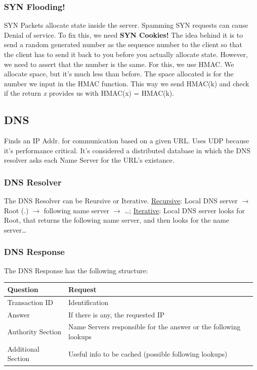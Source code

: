 \documentclass[11pt]{article}
\begin{document}
{\subsubsection{SYN Flooding!}
\label{sec:orgac9980e}
SYN Packets allocate state inside the server. Spamming SYN requests can cause Denial of service. To fix this, we need \textbf{SYN Cookies!} The idea behind it is to send a random generated number as the sequence number to the client so that the client has to send it back to you before you actually allocate state. However, we need to assert that the number is the same. For this, we use HMAC. We allocate space, but it's much less than before. The space allocated is for the number we input in the HMAC function. This way we send HMAC(k) and check if the return \emph{x} provides us with HMAC(x) = HMAC(k).  
\subsection{DNS}
\label{sec:org6643c62}
Finds an IP Addr. for communication based on a given URL. Uses UDP because it's performance critical. It's considered a distributed database in which the DNS resolver asks each Name Server for the URL's existance.
\subsubsection{DNS Resolver}
\label{sec:org5d5ad7b}
The DNS Resolver can be Reursive or Iterative. \uline{Recursive}: Local DNS server \(\to\) Root (.) \(\to\) following name server \(\to\) \ldots{}; \uline{Iterative}: Local DNS server looks for Root, that returns the following name server, and then looks for the name server\ldots{}
\subsubsection{DNS Response}
\label{sec:org6947433}
The DNS Response has the following structure:

\begin{center}
\begin{tabular}{l|l}
\hline
Question & Request\\
\hline
Transaction ID & Identification\\
\hline
Answer & If there is any, the requested IP\\
\hline
Authority Section & Name Servers responsible for the answer or the following lookups\\
\hline
Additional Section & Useful info to be cached (possible following lookups)\\
\hline
\end{tabular}
\end{center}

}
\end{document}
